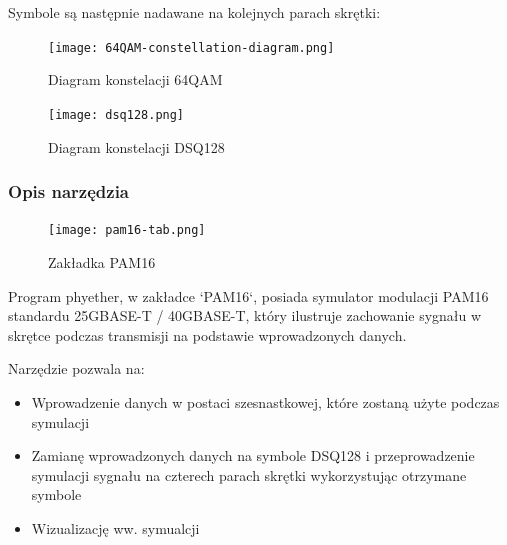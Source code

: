 Symbole są następnie nadawane na kolejnych parach skrętki:
\begin{table}[h]
    \centering
\end{table}

\begin{figure}[h]
    \centering
    \texttt{[image: 64QAM-constellation-diagram.png]}
    \caption{Diagram konstelacji 64QAM}
    \label{fig:lab-64QAM}
\end{figure}

\begin{figure}[h]
    \centering
    \texttt{[image: dsq128.png]}
    \caption{Diagram konstelacji DSQ128}
    \label{fig:lab-dsq128}
\end{figure}

\clearpage

\subsubsection{Opis narzędzia}

\begin{figure}[ht]
    \centering
    \texttt{[image: pam16-tab.png]}
    \caption{Zakładka PAM16}
    \label{fig:zakladka_pam16}
\end{figure}

Program phyether, w zakładce `PAM16`, posiada symulator modulacji PAM16 standardu 25GBASE-T / 40GBASE-T, który ilustruje zachowanie
sygnału w skrętce podczas transmisji na podstawie wprowadzonych danych.

Narzędzie pozwala na:
\begin{itemize}
    \item Wprowadzenie danych w postaci szesnastkowej, które zostaną użyte podczas symulacji
    \item Zamianę wprowadzonych danych na symbole DSQ128 i przeprowadzenie symulacji sygnału na czterech parach skrętki 
        wykorzystując otrzymane symbole
    \item Wizualizację ww. symualcji
\end{itemize}

